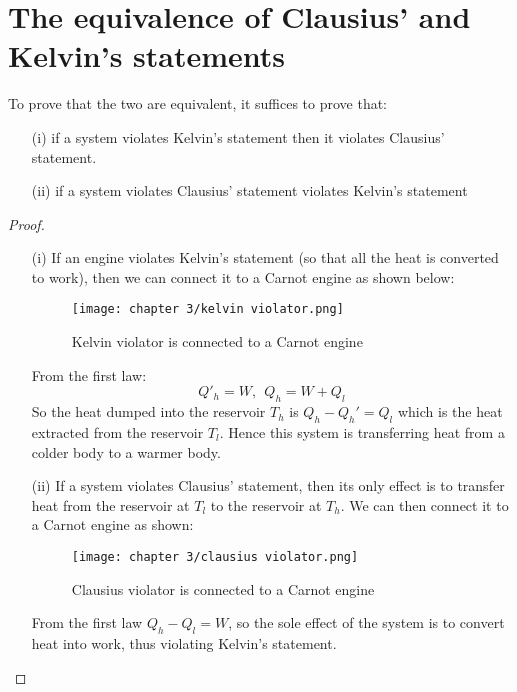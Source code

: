 \documentclass[a4paper,11pt,oneside]{book}
\begin{document}
\section{The equivalence of Clausius' and Kelvin's statements}
To prove that the two are equivalent, it suffices to prove that:
\begin{enumerate}
    \item[(i)] if a system violates Kelvin's statement then it violates Clausius' statement.
    \item[(ii)] if a system violates Clausius' statement violates Kelvin's statement
\end{enumerate}
\begin{proof}
\begin{enumerate}
    \item[(i)] If an engine violates Kelvin's statement (so that all the heat is converted to work), then we can connect it to a Carnot engine as shown below:
    \begin{figure}[h!]
        \centering
        \texttt{[image: chapter 3/kelvin violator.png]}
        \caption{Kelvin violator is connected to a Carnot engine}
        \label{fig:my_label}
    \end{figure}
    From the first law:
    \begin{equation}
        Q'_h = W, \ \ Q_h = W + Q_l
    \end{equation}
    So the heat dumped into the reservoir $T_h$ is $Q_h-Q_h'=Q_l$ which is the heat extracted from the reservoir $T_l$. Hence this system is transferring heat from a colder body to a warmer body. 
    \item[(ii)] If a system violates Clausius' statement, then its only effect is to transfer heat from the reservoir at $T_l$ to the reservoir at $T_h$. We can then connect it to a Carnot engine as shown:
    \begin{figure}[h!]
        \centering
        \texttt{[image: chapter 3/clausius violator.png]}
        \caption{Clausius violator is connected to a Carnot engine}
        \label{fig:my_label}
    \end{figure}
    
    
    From the first law $Q_h - Q_l=W$, so the sole effect of the system is to convert heat into work, thus violating Kelvin's statement. 
\end{enumerate}
\end{proof}
\end{document}
